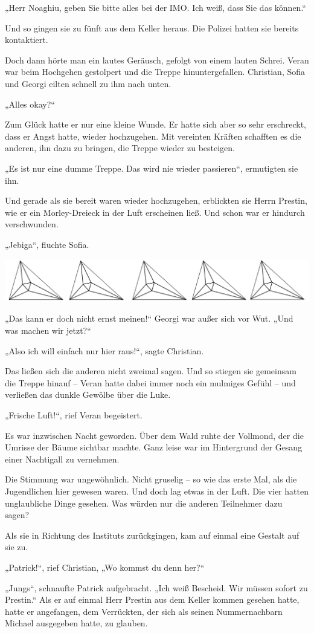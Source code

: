 \documentclass[oneside]{memoir}
\newcommand{\parasep}{
\bigskip
\bigskip
\begin{center} 
   \includegraphics[scale=.08]{parasep5.jpg} 
\end{center}
\bigskip
\bigskip
}
\begin{document}
„Herr Noaghiu, geben Sie bitte alles bei der IMO. Ich weiß, dass Sie das können.“

Und so gingen sie zu fünft aus dem Keller heraus. Die Polizei hatten sie bereits kontaktiert.

Doch dann hörte man ein lautes Geräusch, gefolgt von einem lauten Schrei. Veran war beim Hochgehen gestolpert und die Treppe hinuntergefallen. Christian, Sofia und Georgi eilten schnell zu ihm nach unten.

„Alles okay?“

Zum Glück hatte er nur eine kleine Wunde. Er hatte sich aber so sehr erschreckt, dass er Angst hatte, wieder hochzugehen. Mit vereinten Kräften schafften es die anderen, ihn dazu zu bringen, die Treppe wieder zu besteigen.

„Es ist nur eine dumme Treppe. Das wird nie wieder passieren“, ermutigten sie ihn.

Und gerade als sie bereit waren wieder hochzugehen, erblickten sie Herrn Prestin, wie er ein Morley-Dreieck in der Luft erscheinen ließ. Und schon war er hindurch verschwunden.

„Jebiga“, fluchte Sofia.

\parasep
     
„Das kann er doch nicht ernst meinen!“ Georgi war außer sich vor Wut. „Und was machen wir jetzt?“

„Also ich will einfach nur hier raus!“, sagte Christian.

Das ließen sich die anderen nicht zweimal sagen. Und so stiegen sie gemeinsam die Treppe hinauf -- Veran hatte dabei immer noch ein mulmiges Gefühl -- und verließen das dunkle Gewölbe über die Luke.

„Frische Luft!“, rief Veran begeistert.

Es war inzwischen Nacht geworden. Über dem Wald ruhte der Vollmond, der die Umrisse der Bäume sichtbar machte. Ganz leise war im Hintergrund der Gesang einer Nachtigall zu vernehmen.

Die Stimmung war ungewöhnlich. Nicht gruselig – so wie das erste Mal, als die Jugendlichen hier gewesen waren. Und doch lag etwas in der Luft. Die vier hatten unglaubliche Dinge gesehen. Was würden nur die anderen Teilnehmer dazu sagen?

\bigskip
Als sie in Richtung des Instituts zurückgingen, kam auf einmal eine Gestalt auf sie zu.

„Patrick!“, rief Christian, „Wo kommst du denn her?“

„Jungs“, schnaufte Patrick aufgebracht. „Ich weiß Bescheid. Wir müssen sofort zu Prestin.“ Als er auf einmal Herr Prestin aus dem Keller kommen gesehen hatte, hatte er angefangen, dem Verrückten, der sich als seinen Nummernachbarn Michael ausgegeben hatte, zu glauben.
\end{document}
